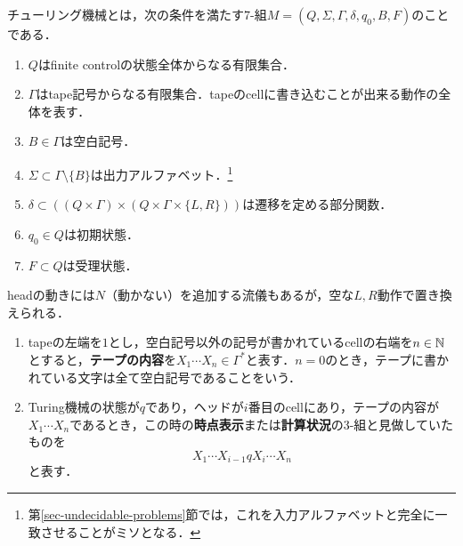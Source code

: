 \documentclass[uplatex, dvipdfmx]{jsreport}
\begin{document}
\begin{definition}
    チューリング機械とは，次の条件を満たす7-組$M=(Q,\Sigma,\Gamma,\delta,q_0,B,F)$のことである．
    \begin{enumerate}
        \item $Q$はfinite controlの状態全体からなる有限集合．
        \item $\Gamma$はtape記号からなる有限集合．tapeのcellに書き込むことが出来る動作の全体を表す．
        \item $B\in\Gamma$は空白記号．
        \item $\Sigma\subset\Gamma\setminus\{B\}$は出力アルファベット．\footnote{第\ref{sec-undecidable-problems}節では，これを入力アルファベットと完全に一致させることがミソとなる．}
        \item $\delta\subset((Q\times\Gamma)\times(Q\times\Gamma\times\{L,R\}))$は遷移を定める部分関数．
        \item $q_0\in Q$は初期状態．
        \item $F\subset Q$は受理状態．
    \end{enumerate}
\end{definition}
\begin{remark}
    headの動きには$N$（動かない）を追加する流儀もあるが，空な$L,R$動作で置き換えられる．
\end{remark}

\begin{definition}\mbox{}
    \begin{enumerate}
        \item tapeの左端を$1$とし，空白記号以外の記号が書かれているcellの右端を$n\in\mathbb{N}$とすると，\textbf{テープの内容}を$X_1\cdots X_n\in\Gamma^*$と表す．$n=0$のとき，テープに書かれている文字は全て空白記号であることをいう．
        \item Turing機械の状態が$q$であり，ヘッドが$i$番目のcellにあり，テープの内容が$X_1\cdots X_n$であるとき，この時の\textbf{時点表示}または\textbf{計算状況}の3-組と見做していたものを
        \[X_1\cdots X_{i-1}qX_{i}\cdots X_n\]
        と表す．
    \end{enumerate}
\end{definition}
\end{document}

